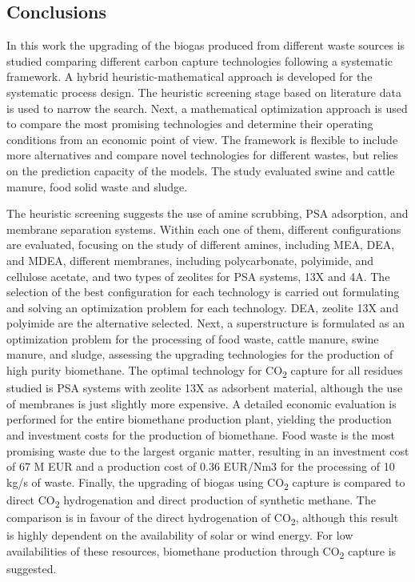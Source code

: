\begin{refsection}[referencesCh7]
\section{Conclusions}\label{section:Sec5}
In this work the upgrading of the biogas produced from different waste sources is studied comparing different carbon capture technologies following a systematic framework. A hybrid heuristic-mathematical approach is developed for the systematic process design. The heuristic screening stage based on literature data is used to narrow the search. Next, a mathematical optimization approach is used to compare the most promising technologies and determine their operating conditions from an economic point of view. The framework is flexible to include more alternatives and compare novel technologies for different wastes, but relies on the prediction capacity of the models. The study evaluated swine and
cattle manure, food solid waste and sludge.

The heuristic screening suggests the use of amine scrubbing, PSA adsorption, and membrane separation systems. Within each one of them, different configurations are evaluated, focusing on the study of different amines, including MEA, DEA, and MDEA, different membranes, including polycarbonate, polyimide, and cellulose acetate, and two types of zeolites for PSA systems, 13X and 4A. The selection of the best configuration for each technology is carried out formulating and solving an optimization problem for each
technology. DEA, zeolite 13X and polyimide are the alternative selected. Next, a superstructure is formulated as an optimization problem for the processing of food waste, cattle manure, swine manure, and sludge, assessing the upgrading technologies for the production of high purity biomethane. The optimal technology for CO\textsubscript{2} capture for all residues studied is PSA systems with zeolite 13X as adsorbent material, although the use of membranes is just slightly more expensive. A detailed economic evaluation is performed for the entire biomethane production plant, yielding the production and investment costs for the production of biomethane. Food waste is the most promising waste due to the largest organic matter, resulting in an investment cost of 67 M EUR and a production cost of 0.36 EUR/Nm3 for the processing of 10 kg/s of waste. Finally, the upgrading of biogas using CO\textsubscript{2} capture is compared to direct CO\textsubscript{2} hydrogenation and direct production of synthetic methane. The comparison is in favour of the direct hydrogenation of CO\textsubscript{2}, although this result is highly dependent on the availability of solar or wind energy. For low availabilities of these resources, biomethane production through CO\textsubscript{2} capture is suggested.


\end{refsection}
